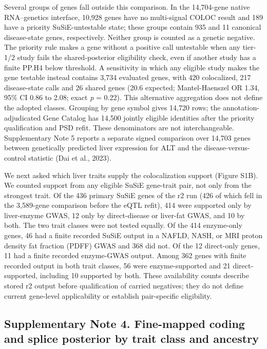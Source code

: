 Several groups of genes fall outside this comparison. In the 14,704-gene native RNA--genetics interface, 10,928 genes have no multi-signal COLOC result and 189 have a priority SuSiE-untestable state; these groups contain 935 and 11 canonical disease-state genes, respectively. Neither group is counted as a genetic negative. The priority rule makes a gene without a positive call untestable when any tier-1/2 study fails the shared-posterior eligibility check, even if another study has a finite PP.H4 below threshold. A sensitivity in which any eligible study makes the gene testable instead contains 3,734 evaluated genes, with 420 colocalized, 217 disease-state calls and 26 shared genes (20.6 expected; Mantel-Haenszel OR 1.34, 95\% CI 0.86 to 2.08; exact \emph{p} = 0.22). This alternative aggregation does not define the adopted classes. Grouping by gene symbol gives 14,720 rows; the annotation-adjudicated Gene Catalog has 14,500 jointly eligible identities after the priority qualification and PSD refit. These denominators are not interchangeable. Supplementary Note 5 reports a separate signed comparison over 14,703 genes between genetically predicted liver expression for ALT and the disease-versus-control statistic (Dai et al., 2023).

We next asked which liver traits supply the colocalization support (Figure S1B). We counted support from any eligible SuSiE gene-trait pair, not only from the strongest trait. Of the 436 primary SuSiE genes of the r2 run (426 of which fell in the 3,589-gene comparison before the eQTL refit), 414 were supported only by liver-enzyme GWAS, 12 only by direct-disease or liver-fat GWAS, and 10 by both. The two trait classes were not tested equally. Of the 414 enzyme-only genes, 46 had a finite recorded SuSiE output in a NAFLD, NASH, or MRI proton density fat fraction (PDFF) GWAS and 368 did not. Of the 12 direct-only genes, 11 had a finite recorded enzyme-GWAS output. Among 362 genes with finite recorded output in both trait classes, 56 were enzyme-supported and 21 direct-supported, including 10 supported by both. These availability counts describe stored r2 output before qualification of carried negatives; they do not define current gene-level applicability or establish pair-specific eligibility. 

\subsection{Supplementary Note 4. Fine-mapped coding and splice posterior by trait class and ancestry}\label{supplementary-note-4.-fine-mapped-coding-and-splice-posterior-by-trait-class-and-ancestry}

